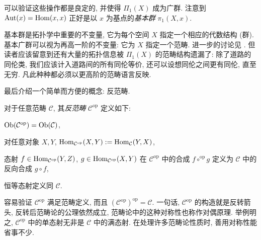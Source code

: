 \begin{example}[基本广群]
	可以验证这些操作都是良定的, 并使得 $\Pi_1(X)$ 成为广群. 注意到 $\operatorname{Aut}(x) = \operatorname{Hom}(x,x)$ 正好是以 $x$ 为基点的\emph{基本群} $\pi_1(X, x)$.

	基本群是拓扑学中重要的不变量, 它为每个空间 $X$ 指定一个相应的代数结构 (群). 基本广群可以视为再高一阶的不变量: 它为 $X$ 指定一个范畴. 进一步的讨论见 \cite[Chapter 2]{May99}. 但读者应该留意到还有大量的拓扑信息被 $\Pi_1(X)$ 的范畴结构遗漏了: 除了道路的同伦类, 我们应该计入道路间的所有同伦等价, 还可以设想同伦之间更有同伦, 直至无穷. 凡此种种都必须以更高阶的范畴语言反映.
\end{example}

最后介绍一个简单而方便的概念: 反范畴.
\begin{definition}
	对于任意范畴 $\mathcal{C}$, 其\emph{反范畴} $\mathcal{C}^\text{op}$ 定义如下:
	\begin{compactitem}
		\item $\operatorname{Ob}(\mathcal{C}^{\text{op}}) = \operatorname{Ob}(\mathcal{C})$,
		\item 对任意对象 $X, Y$, $\operatorname{Hom}_{\mathcal{C}^{\text{op}}}(X, Y) := \operatorname{Hom}_{\mathcal{C}}(Y, X)$,
		\item 态射 $f \in \operatorname{Hom}_{\mathcal{C}^{\text{op}}}(Y, Z)$, $g \in \operatorname{Hom}_{\mathcal{C}^{\text{op}}}(X, Y)$ 在 $\mathcal{C}^{\text{op}}$ 中的合成 $f \circ^\text{op} g$ 定义为 $\mathcal{C}$ 中的反向合成 $g \circ f$,
		\item 恒等态射定义同 $\mathcal{C}$.
	\end{compactitem}
\end{definition}
容易验证 $\mathcal{C}^\text{op}$ 满足范畴定义, 而且 $(\mathcal{C}^\text{op})^{\text{op}} = \mathcal{C}$. 一句话, $\mathcal{C}^\text{op}$ 的构造就是反转箭头, 反转后范畴论的公理依然成立, 范畴论中的这种对称性也称作对偶原理. 举例明之, $\mathcal{C}^\text{op}$ 中的单态射无非是 $\mathcal{C}$ 中的满态射. 在处理许多范畴论性质时, 善用对称性能省事不少.

